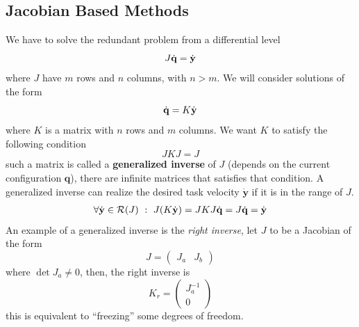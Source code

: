 \documentclass[10pt, a4paper]{report}
\begin{document}
\subsection{Jacobian Based Methods}
We have to solve the redundant problem from a differential level\begin{equation}
    J{\dot{\mathbf q}}=\dot{\mathbf y}
\end{equation}
where $J$ have $m$ rows and $n$ columns, with $n>m$. We will consider solutions of the form\begin{equation}
    {\dot{\mathbf q}} = K\dot{\mathbf y}
\end{equation}
where $K$ is a matrix with $n$ rows and $m$ columns. We want $K$ to satisfy the following condition\begin{equation}
    JKJ=J
\end{equation}
such a matrix is called a \textbf{generalized inverse} of $J$ (depends on the current configuration $\mathbf q$), there are infinite matrices that satisfies that condition. A generalized inverse can realize the desired task velocity $\dot{\mathbf y}$ if it is in the range of $J$.\begin{align}
    \forall \dot{\mathbf y}\in\mathcal R(J) \ : \ J(K\dot{\mathbf y})=JKJ{\dot{\mathbf q}}=J{\dot{\mathbf q}}=\dot{\mathbf y}
\end{align}
An example of a generalized inverse is the \textit{right inverse}, let $J$ to be a Jacobian of the form\begin{equation}
    J=\begin{pmatrix}
        J_a&J_b
    \end{pmatrix}
\end{equation}
where $\det J_a\ne0$, then, the right inverse is \begin{equation}
    K_r=\begin{pmatrix}
        J_a^{-1}\\ 0
    \end{pmatrix}
\end{equation}
this is equivalent to ``freezing'' some degrees of freedom. \bigskip 
\end{document}
